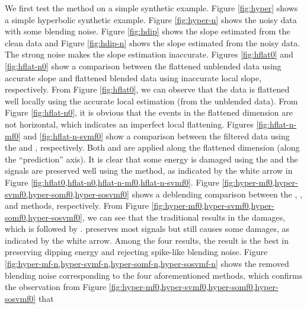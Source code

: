 We first test the  method on a simple synthetic example. Figure \ref{fig:hyper} shows a simple hyperbolic synthetic example.  Figure \ref{fig:hyper-n} shows the noisy data with some
blending noise. Figure \ref{fig:hdip} shows the slope estimated from the clean data and Figure \ref{fig:hdip-n} shows the slope estimated from the noisy data. The strong noise makes the slope estimation inaccurate. Figures \ref{fig:hflat0} and \ref{fig:hflat-n0} show a comparison between the flattened unblended data using accurate slope and flattened blended data using inaccurate local slope, respectively. From Figure \ref{fig:hflat0}, we can observe that the data is flattened well locally using the accurate local estimation (from the unblended data). From Figure \ref{fig:hflat-n0}, it is obvious that the events in the flattened dimension are not horizontal, which indicates an imperfect local flattening.  Figures \ref{fig:hflat-n-mf0} and \ref{fig:hflat-n-svmf0} show a comparison between the filtered data using the and , respectively. Both and  are applied along the flattened dimension (along the ``prediction'' axis). It is clear that some energy is damaged using the and the signals are preserved well using the  method, as indicated by the white arrow in Figure \ref{fig:hflat0,hflat-n0,hflat-n-mf0,hflat-n-svmf0}.  Figure \ref{fig:hyper-mf0,hyper-svmf0,hyper-somf0,hyper-sosvmf0} shows a deblending comparison between the  , , and  methods, respectively. From Figure \ref{fig:hyper-mf0,hyper-svmf0,hyper-somf0,hyper-sosvmf0}, we can see that the traditional results in the  damages, which is followed by .  preserves most signals but still causes some damages, as indicated by the white arrow. Among the four results, the  result is the best in preserving dipping energy and rejecting spike-like blending noise.  Figure \ref{fig:hyper-mf-n,hyper-svmf-n,hyper-somf-n,hyper-sosvmf-n} shows the removed blending noise corresponding to the four aforementioned methods, which confirms the observation from Figure \ref{fig:hyper-mf0,hyper-svmf0,hyper-somf0,hyper-sosvmf0} that 